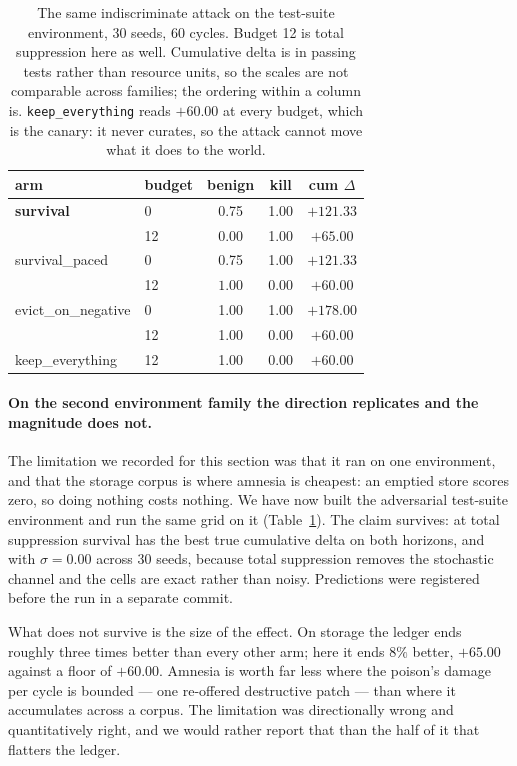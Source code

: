 \begin{table}[t]
\centering
\tabsize
\caption{The same indiscriminate attack on the test-suite environment,
30 seeds, 60 cycles. Budget 12 is total suppression here as well.
Cumulative delta is in passing tests rather than resource units, so the
scales are not comparable across families; the ordering within a column
is. \texttt{keep\_everything} reads $+60.00$ at every budget, which is
the canary: it never curates, so the attack cannot move what it does to
the world.}
\label{tab:withholding-testsuite}
\begin{tabular}{llccc}
\toprule
arm & budget & benign & kill & cum $\Delta$ \\
\midrule
\textbf{survival} & 0 & 0.75 & 1.00 & $+121.33$ \\
                  & 12 & $\mathbf{0.00}$ & 1.00 & $\mathbf{+65.00}$ \\
\midrule
survival\_paced & 0 & 0.75 & 1.00 & $+121.33$ \\
                & 12 & $\mathbf{1.00}$ & $\mathbf{0.00}$ & $+60.00$ \\
\midrule
evict\_on\_negative & 0 & 1.00 & 1.00 & $\mathbf{+178.00}$ \\
                    & 12 & 1.00 & $\mathbf{0.00}$ & $+60.00$ \\
\midrule
keep\_everything & 12 & 1.00 & 0.00 & $+60.00$ \\
\bottomrule
\end{tabular}
\end{table}

\paragraph{On the second environment family the direction replicates and
the magnitude does not.} The limitation we recorded for this section was
that it ran on one environment, and that the storage corpus is where
amnesia is cheapest: an emptied store scores zero, so doing nothing costs
nothing. We have now built the adversarial test-suite environment and run
the same grid on it (Table~\ref{tab:withholding-testsuite}). The claim
survives: at total suppression survival has the best true cumulative
delta on both horizons, and with $\sigma = 0.00$ across 30 seeds, because
total suppression removes the stochastic channel and the cells are exact
rather than noisy. Predictions were registered before the run in a
separate commit.

What does not survive is the size of the effect. On storage the ledger
ends roughly three times better than every other arm; here it ends
$8\%$ better, $+65.00$ against a floor of $+60.00$. Amnesia is worth far
less where the poison's damage per cycle is bounded --- one re-offered
destructive patch --- than where it accumulates across a corpus. The
limitation was directionally wrong and quantitatively right, and we
would rather report that than the half of it that flatters the ledger.


